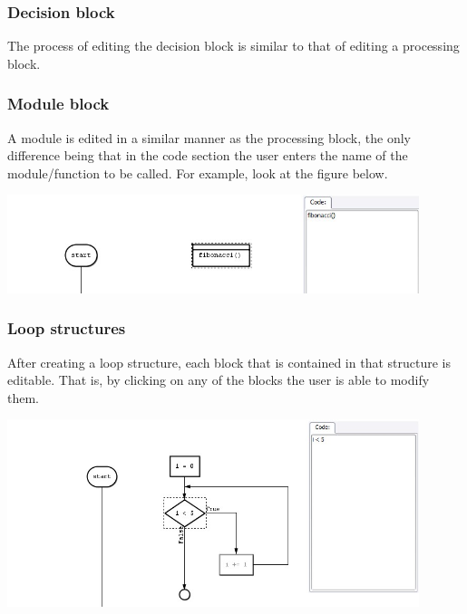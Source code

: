 \documentclass[11pt,a4paper,titlepage]{article}
\begin{document}
	\subsubsection{Decision block}
	
	The process of editing the decision block is similar to that of editing a processing block. 
	
	\subsubsection{Module block}
	
	A module is edited in a similar manner as the processing block, the only difference being that in the code section the user enters the name of the module/function to be called. For example, look at the figure below. \newline \newline
	
	\includegraphics[width=12cm]{images/editModule.jpg} \newline
	
	\subsubsection{Loop structures}
	
	After creating a loop structure, each block that is contained in that structure is editable. That is, by clicking on any of the blocks the user is able to modify them. \newline \newline
	
	\includegraphics[width=12cm]{images/editLoop.jpg} \newline
	
\end{document}
